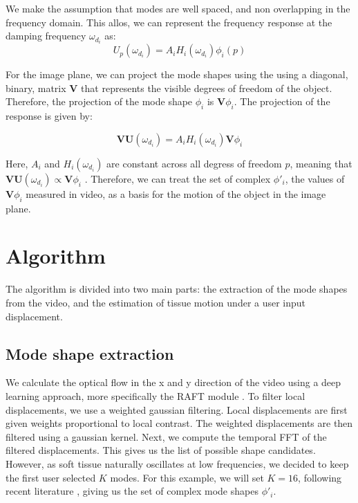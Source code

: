 \documentclass{article}
\begin{document}
We make the assumption that modes are well spaced, and non overlapping in the frequency domain. This allos, we can represent the frequency response at the damping frequency $\omega_{d_{i}}$ as:
\begin{equation*}
    U_{p}(\omega_{d_{i}}) = A_{i}H_{i}(\omega_{d_{i}})\phi_{i}(p)
\end{equation*}

For the image plane, we can project the mode shapes using the using a diagonal, binary, matrix $\mathbf{V}$ that represents the visible degrees of freedom of the object. Therefore, the projection of the mode shape $\phi_{i}$ is $\mathbf{V}\phi_{i}$. The projection of the response is given by:

\begin{equation*}
    \mathbf{V}\mathbf{U}(\omega_{d_{i}}) = A_{i}H_{i}(\omega_{d_{i}})\mathbf{V}\phi_{i}
\end{equation*}

Here, $A_{i}$ and $H_{i}(\omega_{d_{i}})$ are constant across all degress of freedom $p$, meaning that $\mathbf{V}\mathbf{U}(\omega_{d_{i}}) \propto \mathbf{V}\phi_{i}$ . Therefore, we can treat the set of complex $\phi'_{i}$, the values of $\mathbf{V}\phi_{i}$ measured in video, as a basis for the motion of the object in the image plane.

\section*{Algorithm}
The algorithm is divided into two main parts: the extraction of the mode shapes from the video, and the estimation of tissue motion under a user input displacement. 

\subsection*{Mode shape extraction}
We calculate the optical flow in the x and y direction of the video using a deep learning approach, more specifically the RAFT module \cite{teed_raft_2020}. To filter local displacements, we use a weighted gaussian filtering. Local displacements are first given weights proportional to local contrast. The weighted displacements are then filtered using a gaussian kernel. Next, we compute the temporal FFT of the filtered displacements. This gives us the list of possible shape candidates. However, as soft tissue naturally oscillates at low frequencies, we decided to keep the first user selected $K$ modes. For this example, we will set $K=16$, following recent literature \cite{li_generative_2023}, giving us the set of complex mode shapes $\phi'_{i}$.
\end{document}
